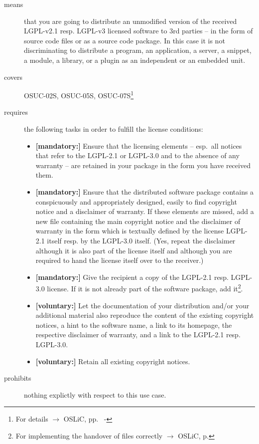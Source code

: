 \begin{description}

\item[means] that you are going to distribute an unmodified version of the
received LGPL-v2.1 resp. LGPL-v3 licensed software to 3rd parties -- in the form
of source code files or as a source code package. In this case it is not
discriminating to distribute a program, an application, a server, a snippet, a
module, a library, or a plugin as an independent or an embedded unit.

\item[covers] OSUC-02S, OSUC-05S, OSUC-07S\footnote{For details $\rightarrow$
OSLiC, pp.\ \pageref{OSUC-02S-DEF} - \pageref{OSUC-07S-DEF}}

\item[requires] the following tasks in order to fulfill the license conditions:
\begin{itemize}
 
  \item \textbf{[mandatory:]} Ensure that the licensing elements -- esp.\ all
  notices that refer to the LGPL-2.1 or LGPL-3.0 and to the absence of any
  warranty -- are retained in your package in the form you have received them.

  \item \textbf{[mandatory:]} Ensure that the distributed software package
  contains a conspicuously and appropriately designed, easily to find copyright
  notice and a disclaimer of warranty. If these elements are missed, add a new
  file containing the main copyright notice and the disclaimer of warranty in the
  form which is textually defined by the license LGPL-2.1 itself resp. by the
  LGPL-3.0 itself. (Yes, repeat the disclaimer although it is also part of the
  license itself and although you are required to hand the license itself over
  to the receiver.)
  
  \item \textbf{[mandatory:]} Give the recipient a copy of the LGPL-2.1 resp.
  LGPL-3.0 license. If it is not already part of the software package, add
  it\footnote{For implementing the handover of files correctly $\rightarrow$
  OSLiC, p. \pageref{DistributingFilesHint}}.
  
  \item \textbf{[voluntary:]} Let the documentation of your distribution and/or
  your additional material also reproduce the content of the existing
  copyright notices, a hint to the software name, a link to its homepage,
  the respective disclaimer of warranty, and a link to the LGPL-2.1 resp.
  LGPL-3.0.
  
  \item \textbf{[voluntary:]} Retain all existing copyright notices.
  
\end{itemize}

\item[prohibits] nothing explictly with respect to this use case.

\end{description}


